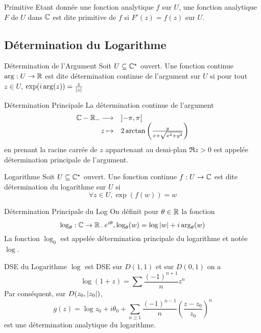 \documentclass{cours}
\begin{document}
\begin{définition}{Primitive}{}
    Etant donnée une fonction analytique $f$ sur $U$, une fonction analytique $F$ de $U$ dans $\mathbb{C}$ est dite primitive de $f$ si $F'(z) = f(z)$ sur $U$. 
\end{définition}

\subsection{Détermination du Logarithme}
\begin{définition}{Détermination de l'Argument}{}
    Soit $U \subseteq \mathbb{C}^{\star}$ ouvert. Une fonction continue $\arg : U \to \mathbb{R}$ est dite détermination continue de l'argument sur $U$ si pour tout $z \in U$, $\exp(i\arg(z))=\frac{z}{\left|z\right|}$
\end{définition}
\begin{définition}{Détermination Principale}{}
    La détermination continue de l'argument 
    \[
        \begin{array}{rl}
            \mathbb{C} - \mathbb{R}_{-} \longrightarrow & \left] - \pi, \pi \right[\\
            z \mapsto & 2\arctan\left(\frac{y}{x + \sqrt{x^{2} + y^{2}}}\right)
        \end{array}
    \]
    en prenant la racine carrée de $z$ appartenant au demi-plan $\Re z > 0$ est appelée détermination principale de l'argument.
\end{définition}
\begin{définition}{Logarithme}{}
    Soit $U \subseteq \mathbb{C}^{\star}$ ouvert. Une fonction continue $f : U \to \mathbb{C}$ est dite détermination du logarithme sur $U$ si 
    \[
        \forall z \in U, \exp(f(w)) = w
    \]
\end{définition}

\begin{définition}{Détermination Principale du Log}{}
    On définit pour $\theta \in \mathbb{R}$ la fonction
    \[
        \log_{\theta} : \mathbb{C} \to \mathbb{R}_{-}e^{i\theta}, \log_{\theta}(w)=\log \left|w\right| + i\arg_{\theta}(w)
    \]
    La fonction $\log_{0}$ est appelée détermination principale du logarithme et notée $\log$. 
\end{définition}

\begin{propositionfr}{DSE du Logarithme}{}
    $\log$ est DSE sur $D(1, 1)$ et sur $D(0, 1)$ on a
    \[
        \log(1 + z) = \sum \frac{(-1)^{n + 1}}{n}z^{n}
    \]
    Par conséquent, sur $D(z_{0}, \left|z_{0}\right|)$, 
    \[
        g(z) = \log z_{0} + i\theta_{0} + \sum_{n \geq 1}\frac{(-1)^{n - 1}}{n}\left(\frac{z - z_{0}}{z_{0}}\right)^{n}
    \]
    est une détermination analytique du logarithme. 
\end{propositionfr}
\end{document}
